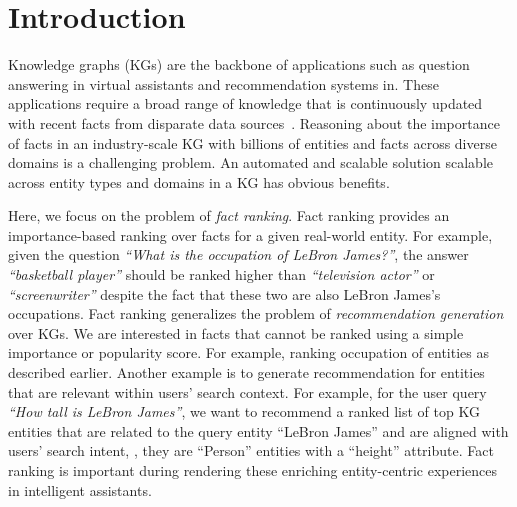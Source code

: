 \section{Introduction}\label{sec:ali_intro}

Knowledge graphs (KGs) are the backbone of applications such as question answering in virtual assistants and recommendation systems in. These applications require a broad range of knowledge that is continuously updated with recent facts from disparate data sources~\cite{apple_kp, industry_kgs}. Reasoning about the importance of facts in an industry-scale KG with billions of entities and facts across diverse domains is a challenging problem. An automated and scalable solution scalable across entity types and domains in a KG has obvious benefits.

Here, we focus on the problem of \emph{fact ranking}. Fact ranking provides an importance-based ranking over facts for a given real-world entity. For example, given the question \emph{``What is the occupation of LeBron James?''}, the answer \emph{``basketball player''} should be ranked higher than \emph{``television actor''} or \emph{``screenwriter''} despite the fact that these two are also LeBron James's occupations. Fact ranking generalizes the problem of \emph{recommendation generation}~\cite{bouraga2014knowledge} over KGs. We are interested in facts that cannot be ranked using a simple importance or popularity score. For example, ranking occupation of entities as described earlier. Another example is to generate recommendation for entities that are relevant within users' search context. For example, for the user query \emph{``How tall is LeBron James''}, we want to recommend a ranked list of top KG entities that are related to the query entity ``LeBron James'' and are aligned with users' search intent, \ie, they are ``Person'' entities with a ``height'' attribute. Fact ranking is important during rendering these enriching entity-centric experiences in intelligent assistants. 




